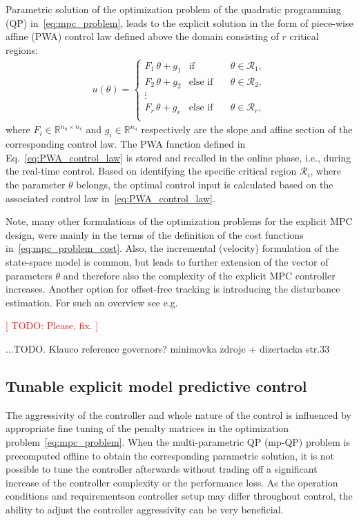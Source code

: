\documentclass[preprint,12pt]{elsarticle}
\begin{document}
Parametric solution of the optimization problem of the quadratic programming (QP) in~\eqref{eq:mpc_problem}, leads to the explicit solution in the form of piece-wise affine (PWA) control law defined above the domain consisting of $r$ critical regions:
\begin{eqnarray}
\label{eq:PWA_control_law}
u(\theta) = \left\{ 
\begin{matrix}
	F_{1} \, \theta + g_{1} & \mathrm{if} & \quad \theta \in \mathcal{R}_1, \\
	F_{2} \, \theta + g_{2} & \mathrm{else}\,\,\mathrm{if} &\quad \theta \in \mathcal{R}_2, \\
	\vdots & \\
	F_{r} \, \theta + g_{r} & \mathrm{else}\,\,\mathrm{if} & \quad \theta \in \mathcal{R}_{r}, \\
\end{matrix}
\right.
\end{eqnarray}
where $F_{i} \in \mathbb{R}^{n_{\mathrm{u}} \times n_{\mathrm{x}}}$ and $g_{i}  \in \mathbb{R}^{n_{\mathrm{u}}}$ respectively are the slope and affine section of the corresponding control law. The PWA function defined in Eq.~\eqref{eq:PWA_control_law} is stored and recalled in the online phase, i.e., during the real-time control. Based on identifying the specific critical region $\mathcal{R}_{i}$, where the parameter $\theta$ belongs, the optimal control input is calculated based on the associated control law in~\eqref{eq:PWA_control_law}.

Note, many other formulations of the optimization problems for the explicit MPC design, were mainly in the terms of the definition of the cost functions in~\eqref{eq:mpc_problem_cost}. Also, the incremental (velocity) formulation of the state-space model is common, but leads to further extension of the vector of parameters $\theta$ and therefore also the complexity of the explicit MPC controller increases. Another option for offset-free tracking is introducing the disturbance estimation. For such an overview see e.g. 

\textcolor{red}{[ TODO: Please, fix. ]}

...TODO. 
Klauco reference governors? minimovka zdroje + dizertacka str.33
      
\subsection{Tunable explicit model predictive control}
\label{sec:tunable}

The aggressivity of the controller and whole nature of the control is influenced by appropriate fine tuning of the penalty matrices in the optimization problem~\eqref{eq:mpc_problem}. When the multi-parametric QP (mp-QP) problem is precomputed offline to obtain the corresponding parametric solution, it is not possible to tune the controller afterwards without trading off a significant increase of the controller complexity or the performance loss. As the operation conditions and requirementson controller setup may differ throughout control, the ability to adjust the controller aggressivity can be very beneficial.
\end{document}
